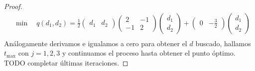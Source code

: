 \documentclass{article}
\begin{document}
\begin{proof}
    \begin{align*}
         & \min \quad q(d_1, d_2) = \frac{1}{2} \begin{pmatrix}
                                                    d_1 & d_2
                                                \end{pmatrix} \begin{pmatrix}
                                                                  2  & -1 \\
                                                                  -1 & 2
                                                              \end{pmatrix} \begin{pmatrix}
                                                                                d_1 \\
                                                                                d_2
                                                                            \end{pmatrix} + \begin{pmatrix}
                                                                                                0 & -\frac{3}{2}
                                                                                            \end{pmatrix} \begin{pmatrix}
                                                                                                              d_1 \\
                                                                                                              d_2
                                                                                                          \end{pmatrix} \\
    \end{align*}
    Análogamente derivamos e igualamos a cero para obtener el \( d \) buscado, hallamos \( t_{\max} \) con \( j = 1, 2, 3 \) y continuamos el proceso hasta obtener el punto óptimo. TODO completar últimas iteraciones.
\end{proof}
\end{document}
